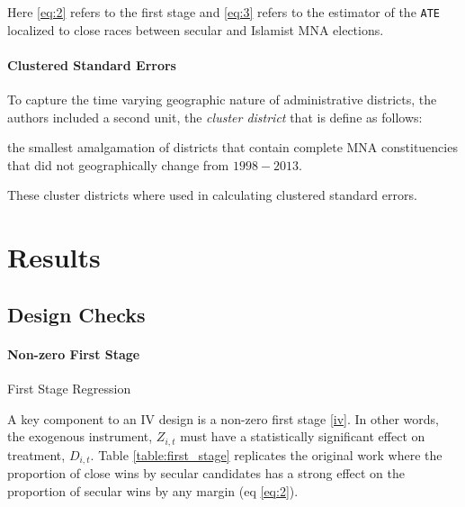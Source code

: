 \documentclass{scrartcl}
\begin{document}
Here \ref{eq:2} refers to the first stage and \ref{eq:3} refers to the estimator of the \texttt{ATE} localized to close races between secular and Islamist MNA elections.  

\paragraph{Clustered Standard Errors}

To capture the time varying geographic nature of administrative districts, the authors included a second unit, the \textit{cluster district} that is define as follows:

\begin{displayquote}
  the smallest amalgamation of districts that contain complete MNA constituencies that did not geographically change from $1998 - 2013$.
\end{displayquote}

These cluster districts where used in calculating clustered standard errors.


\section{Results}

\subsection{Design Checks}

\paragraph{Non-zero First Stage}

\begin{table}[ht]
  \begin{center}
    \scalebox{0.85}{
      
    }
    \caption{First Stage Regression}
    \label{table:first_stage}
  \end{center}
\end{table}

A key component to an IV design is a non-zero first stage \ref{iv}. In other words, the exogenous instrument, $Z_{i,t}$ must have a statistically significant effect on treatment, $D_{i,t}$.
Table \ref{table:first_stage} replicates the original work where the proportion of close wins by secular candidates has a strong effect on the proportion of secular wins by any margin (eq \ref{eq:2}).

\end{document}
